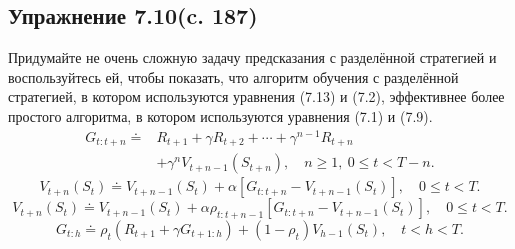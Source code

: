 \subsection{Упражнение 7.10(c. 187)}
Придумайте не очень сложную задачу предсказания
с разделённой стратегией и воспользуйтесь ей, чтобы показать, что алгоритм
обучения с разделённой стратегией, в котором используются уравнения (7.13) и
(7.2), эффективнее более простого алгоритма, в котором используются уравнения
(7.1) и (7.9).
\begin{equation}
    \begin{aligned}
    G_{t:t+n} \doteq{}& R_{t+1} + \gamma R_{t+2} + \cdots
    + \gamma^{n-1}R_{t+n} \\
    &+ \gamma^n V_{t+n-1}(S_{t+n}), \quad n \ge 1,\ 0 \le t < T-n.
    \end{aligned}
    \tag{7.1}
\end{equation}
\begin{equation}
    V_{t+n}(S_t) \doteq V_{t+n-1}(S_t) + \alpha\left[G_{t:t+n} - V_{t+n-1}(S_t)\right],
    \quad 0 \le t < T.
    \tag{7.2}
\end{equation}
\begin{equation}
    V_{t+n}(S_t) \doteq V_{t+n-1}(S_t)
    + \alpha\rho_{t:t+n-1}\left[G_{t:t+n} - V_{t+n-1}(S_t)\right],
    \quad 0 \le t < T.
    \tag{7.9}
\end{equation}
\begin{equation}
    G_{t:h} \doteq \rho_t\left(R_{t+1} + \gamma G_{t+1:h}\right) + (1-\rho_t)V_{h-1}(S_t),
    \quad t < h < T.
    \tag{7.13}
\end{equation}
